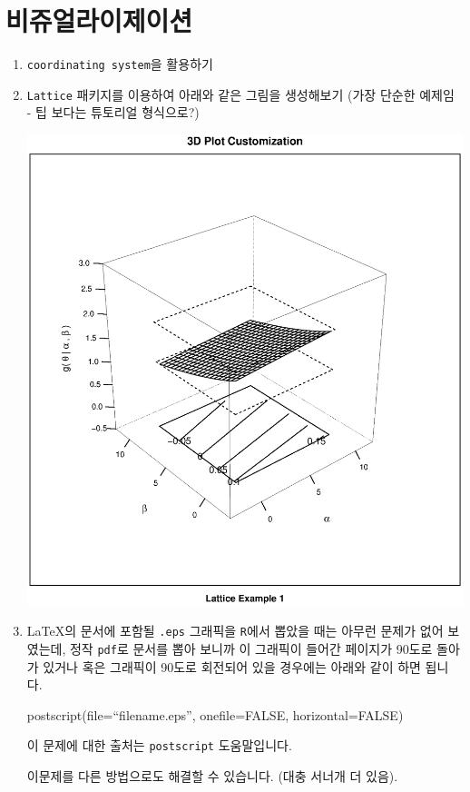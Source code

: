 %
%

\section{비쥬얼라이제이션}
\begin{enumerate}
\item \texttt{coordinating system}을 활용하기

\item \texttt{Lattice} 패키지를 이용하여 아래와 같은 그림을 생성해보기 (가장 단순한 예제임 - 팁 보다는 튜토리얼 형식으로?)

\includegraphics{./img/lattice-fig.eps}


\item \LaTeX 의 문서에 포함될 \texttt{.eps} 그래픽을 \texttt{R}에서 뽑았을 때는 아무런 문제가 없어 보였는데, 정작 \texttt{pdf}로 문서를 뽑아 보니까 이 그래픽이 들어간 페이지가 90도로 돌아가 있거나 혹은 그래픽이 90도로 회전되어 있을 경우에는 아래와 같이 하면 됩니다.

\begin{Schunk}
 \begin{Sinput}
  postscript(file=``filename.eps'', onefile=FALSE, horizontal=FALSE)
 \end{Sinput}
\end{Schunk}

이 문제에 대한 출처는 \texttt{postscript} 도움말입니다.

이문제를 다른 방법으로도 해결할 수 있습니다.  (대충 서너개 더 있음).
\end{enumerate}

